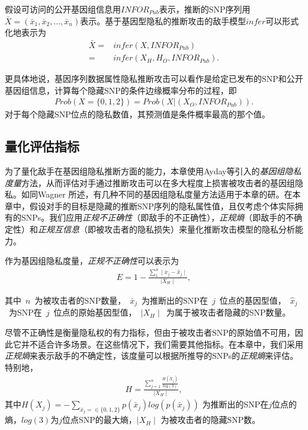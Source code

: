 假设可访问的公开基因组信息用${INFOR}_{Pub}$表示，推断的SNP序列用$\bar{X}=(\bar{x}_1, \bar{x}_2,...,\bar{x}_n)$表示。基于基因型隐私的推断攻击的敌手模型$infer$可以形式化地表示为
\begin{align}\label{eq:adversary-model}
\bar{X} =& infer(X,{INFOR}_{Pub})  \nonumber \\
= & infer(X_H,H_O,{INFOR}_{Pub}).
\end{align}

更具体地说，基因序列数据属性隐私推断攻击可以看作是给定已发布的SNP和公开基因组信息，计算每个隐藏SNP的条件边缘概率分布的过程，即
\begin{align}\label{eq:adversary-model-prob}
Prob(X=\{0,1,2\})=Prob(X|(X_O,{INFOR}_{Pub})).
\end{align}
对于每个隐藏SNP位点的隐私数值，其预测值是条件概率最高的那个值。

\subsection{量化评估指标}


为了量化敌手在基因组隐私推断方面的能力，本章使用Ayday等\cite{ayday2013personal}引入的\textit{基因组隐私度量}方法，从而评估对手通过推断攻击可以在多大程度上损害被攻击者的基因组隐私。如同Wagner
\cite{wagner2017evaluating}
所述，有几种不同的基因组隐私度量方法适用于本章的研。在本章中，假设对手的目标是隐藏的推断SNP序列的隐私属性值，且仅考虑个体实际拥有的SNPs。我们应用\textit{正规不正确性}（即敌手的不正确性），\textit{正规熵}（即敌手的不确定性）和\textit{正规互信息}（即被攻击者的隐私损失）来量化推断攻击模型的隐私分析能力。

作为基因组隐私度量，\textit{正规不正确性}可以表示为
\begin{align}\label{eq:metric-correctness}
E=1- \frac{\sum_1^n \mid \bar{x}_j - \hat{x}_j \mid}  {\mid X_H \mid},
\end{align}

其中~$n$~为被攻击者的SNP数量，~$\bar{x}_j$~为推断出的SNP在~$j$~位点的基因型值，~$\hat{x}_j$~为SNP在~$j$~位点的原始基因型值，~$\mid X_H \mid$~为属于被攻击者隐藏的SNP数量。

尽管不正确性是衡量隐私权的有力指标，但由于被攻击者SNP的原始值不可用，因此它并不适合许多场景。在这些情况下，我们需要其他指标。在本章中，我们采用\textit{正规熵}来表示敌手的不确定性，该度量可以根据所推导的SNPs的\textit{正规熵}来评估。特别地，
\begin{align}\label{eq:metric-entropy}
H = \frac{\sum_{j=1}^n \frac{H(X_j)}{log(3)}}{\mid X_H \mid},
\end{align}
其中$H(X_j)= -\sum_{\bar{x}_j=\in \{0,1,2\}}{p(\bar{x}_j)log(p(\bar{x}_j))}$ 为推断出的SNP在$j$位点的熵，$log(3)$为$j$位点SNP的最大熵，$\mid X_H \mid$ 为被攻击者的隐藏SNP数。

